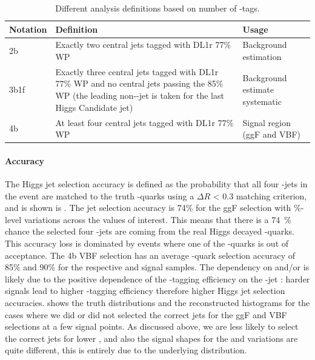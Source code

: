 \begin{table}[!htbp]
	\centering
	  \begin{tabularx}{\textwidth}{l|X|l}
	  Notation     & Definition & Usage \\
	  \toprule
	  2b    & Exactly two central jets tagged with DL1r 77\% WP & Background estimation \\ \hline
	  3b1f  & Exactly three central jets tagged with DL1r 77\% WP and no central jets passing the 85\% WP (the leading \pT non-\Pqb-jet is taken for the last Higgs Candidate jet) & Background estimate systematic \\ \hline
	  4b    & At least four central jets tagged with DL1r 77\% WP & Signal region (ggF and VBF) \\
	  \bottomrule
	  \end{tabularx}
	\caption{Different analysis definitions based on number of \Pqb-tags.}
	\label{tab:b-tag-cat}
  \end{table}%

  \paragraph{Accuracy} The Higgs jet selection accuracy is defined as the probability that all four \Pqb-jets in the event are matched to the truth \Pqb-quarks using a $\Delta R$ < 0.3 matching criterion, and is shown is \Fig{\ref{fig:jetSel-4b}}.
  The jet selection accuracy is 74\% for the ggF selection with \%-level variations across the \kl values of interest. 
  This means that there is a \SI{74}{\%} chance the selected four \Pqb-jets are coming from the real Higgs decayed \Pqb-quarks. This accuracy loss is dominated by events where one of the \Pqb-quarks is out of acceptance. 
  The 4b VBF selection has an average \Pqb-quark selection accuracy of 85\% and 90\% for the respective \kl and \kvv signal samples.
  The dependency on \kl and/or \kvv is likely due to the positive dependence of the \Pqb-tagging efficiency on the \Pqb-jet \pt: harder signals lead to higher \Pqb-tagging efficiency therefore higher Higgs jet selection accuracies. 
  \Fig{\ref{fig:jetSel-mhh}} shows the truth \mhh distributions and the reconstructed histograms for the cases where we did or did not selected the correct jets for the ggF and VBF selections at a few signal points. As discussed above, we are less likely to select the correct jets for lower \mhh, and also the signal shapes for the \kl and \kvv variations are quite different, this is entirely due to the underlying \mhh distribution.
    
